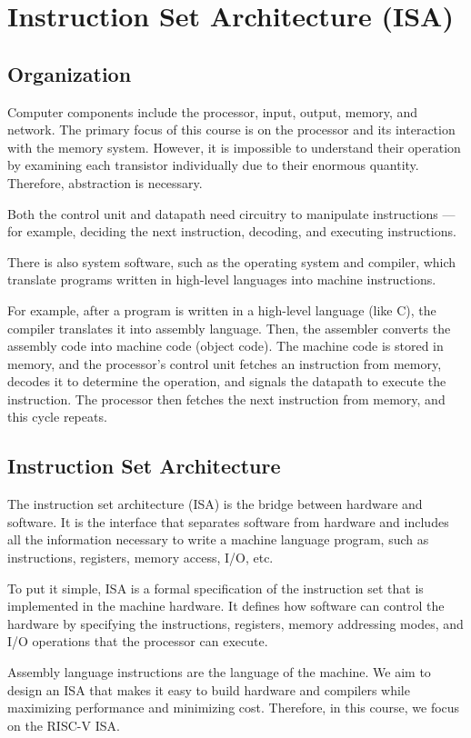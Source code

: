 \chapter{Instruction Set Architecture (ISA)}

\section{Organization}
Computer components include the processor, input, output, memory, and network. The primary focus of this course is on the processor and its interaction with the memory system. However, it is impossible to understand their operation by examining each transistor individually due to their enormous quantity. Therefore, abstraction is necessary.

Both the control unit and datapath need circuitry to manipulate instructions — for example, deciding the next instruction, decoding, and executing instructions.

There is also system software, such as the operating system and compiler, which translate programs written in high-level languages into machine instructions.

For example, after a program is written in a high-level language (like C), the compiler translates it into assembly language. Then, the assembler converts the assembly code into machine code (object code). The machine code is stored in memory, and the processor's control unit fetches an instruction from memory, decodes it to determine the operation, and signals the datapath to execute the instruction. The processor then fetches the next instruction from memory, and this cycle repeats. 

\section{Instruction Set Architecture}
The instruction set architecture (ISA) is the bridge between hardware and software. It is the interface that separates software from hardware and includes all the information necessary to write a machine language program, such as instructions, registers, memory access, I/O, etc. 

To put it simple, ISA is a formal specification of the instruction set that is implemented in the machine hardware. It defines how software can control the hardware by specifying the instructions, registers, memory addressing modes, and I/O operations that the processor can execute.

Assembly language instructions are the language of the machine. We aim to design an ISA that makes it easy to build hardware and compilers while maximizing performance and minimizing cost. Therefore, in this course, we focus on the RISC-V ISA.

